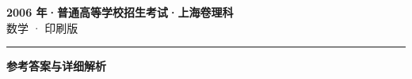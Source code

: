 \documentclass[zihao=5, a4paper]{ctexart}
\begin{document}
\begin{center}
  {\Large\bfseries 2006 年·普通高等学校招生考试·上海卷理科}\\[4pt]
  {\large 数学 · 印刷版}
\end{center}
\medskip
{}

\par\bigskip\hrule\bigskip
{}
\begin{center}{\large\bfseries 参考答案与详细解析}\end{center}
\smallskip

\end{document}

